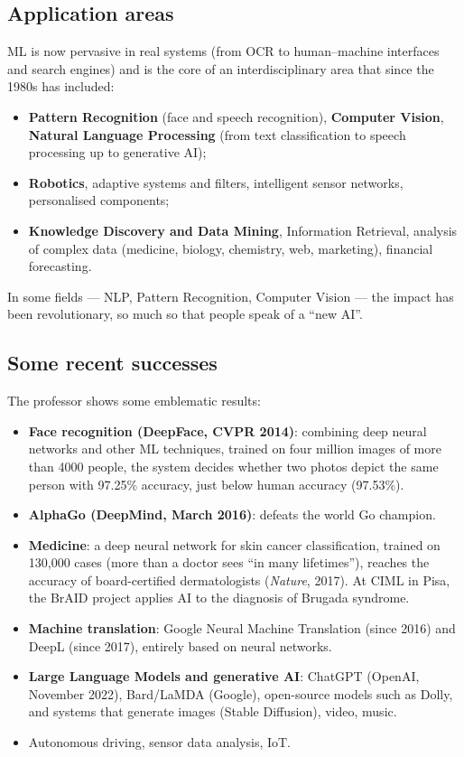 \subsection{Application areas}\label{aree-applicative}

ML is now pervasive in real systems (from OCR to human--machine
interfaces and search engines) and is the core of an interdisciplinary
area that since the 1980s has included:

\begin{itemize}
\tightlist
\item
  \textbf{Pattern Recognition} (face and speech recognition),
  \textbf{Computer Vision}, \textbf{Natural Language Processing} (from
  text classification to speech processing up to generative AI);
\item
  \textbf{Robotics}, adaptive systems and filters, intelligent sensor
  networks, personalised components;
\item
  \textbf{Knowledge Discovery and Data Mining}, Information Retrieval,
  analysis of complex data (medicine, biology, chemistry, web,
  marketing), financial forecasting.
\end{itemize}

In some fields --- NLP, Pattern Recognition, Computer Vision --- the
impact has been revolutionary, so much so that people speak of a ``new
AI''.

\subsection{Some recent successes}\label{alcuni-successi-recenti}

The professor shows some emblematic results:

\begin{itemize}
\tightlist
\item
  \textbf{Face recognition (DeepFace, CVPR 2014)}: combining deep
  neural networks and other ML techniques, trained on four million
  images of more than 4000 people, the system decides whether two
  photos depict the same person with 97.25\% accuracy, just below human
  accuracy (97.53\%).
\item
  \textbf{AlphaGo (DeepMind, March 2016)}: defeats the world Go
  champion.
\item
  \textbf{Medicine}: a deep neural network for skin cancer
  classification, trained on 130,000 cases (more than a doctor sees
  ``in many lifetimes''), reaches the accuracy of board-certified
  dermatologists (\emph{Nature}, 2017). At CIML in Pisa, the BrAID
  project applies AI to the diagnosis of Brugada syndrome.
\item
  \textbf{Machine translation}: Google Neural Machine Translation
  (since 2016) and DeepL (since 2017), entirely based on neural
  networks.
\item
  \textbf{Large Language Models and generative AI}: ChatGPT (OpenAI,
  November 2022), Bard/LaMDA (Google), open-source models such as Dolly,
  and systems that generate images (Stable Diffusion), video, music.
\item
  Autonomous driving, sensor data analysis, IoT.
\end{itemize}

